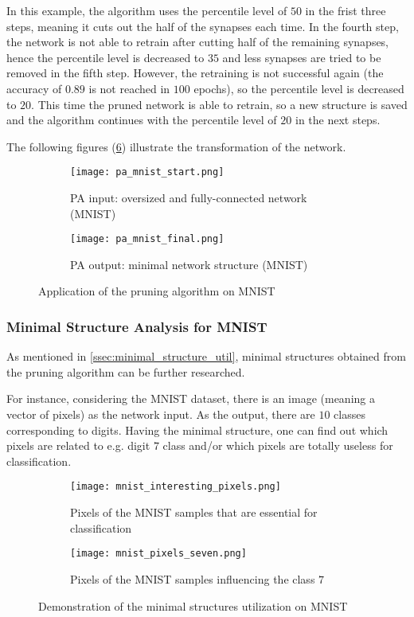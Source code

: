 In this example, the algorithm uses the percentile level of $ 50 $ in the frist three steps, meaning it cuts out the half of the synapses each time. In the fourth step, the network is not able to retrain after cutting half of the remaining synapses, hence the percentile level is decreased to $ 35 $ and less synapses are tried to be removed in the fifth step. However, the retraining is not successful again (the accuracy of $ 0.89 $ is not reached in $ 100 $ epochs), so the percentile level is decreased to $ 20 $. This time the pruned network is able to retrain, so a new structure is saved and the algorithm continues with the percentile level of $ 20 $ in the next steps.

The following figures (\ref{img:pa_xor_morph}) illustrate the transformation of the network.
\begin{figure}[H]
\centering
\begin{subfigure}{0.45\textwidth}
  \centering
  \texttt{[image: pa\_mnist\_start.png]}
  \caption{PA input: oversized and fully-connected network (MNIST)}
  \label{img:pa_xor_start}
\end{subfigure}%
\begin{subfigure}{0.45\textwidth}
  \centering
  \texttt{[image: pa\_mnist\_final.png]}
  \caption{PA output: minimal network structure (MNIST)}
  \label{img:pa_xor_final}
\end{subfigure}
\caption{Application of the pruning algorithm on MNIST}
\label{img:pa_xor_morph}
\end{figure}

\subsubsection{Minimal Structure Analysis for MNIST} \label{sssec:mnist_analysis}
As mentioned in \cref{ssec:minimal_structure_util}, minimal structures obtained from the pruning algorithm can be further researched.

For instance, considering the MNIST dataset, there is an image (meaning a vector of pixels) as the network input. As the output, there are $ 10 $ classes corresponding to digits. Having the minimal structure, one can find out which pixels are related to e.g. digit $ 7 $ class and/or which pixels are totally useless for classification.

\begin{figure}[H]
\centering
\begin{subfigure}{0.45\textwidth}
  \centering
  \texttt{[image: mnist\_interesting\_pixels.png]}
  \caption{Pixels of the MNIST samples that are essential for classification}
  \label{img:msu_interesting}
\end{subfigure}%
\begin{subfigure}{0.45\textwidth}
  \centering
  \texttt{[image: mnist\_pixels\_seven.png]}
  \caption{Pixels of the MNIST samples influencing the class $ 7 $}
  \label{img:msu_seven}
\end{subfigure}
\caption{Demonstration of the minimal structures utilization on MNIST}
\label{img:pa_xor_morph}
\end{figure}

